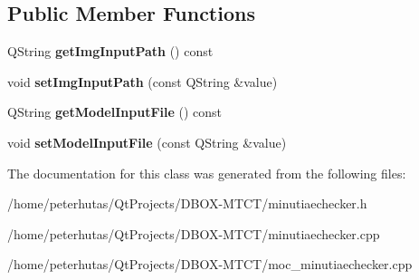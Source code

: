 \subsection*{Public Member Functions}
\begin{DoxyCompactItemize}
\item 
\mbox{\label{class_minutiae_checker_a51e097348e270276c9b228672e0f7bde}} 
Q\+String {\bfseries get\+Img\+Input\+Path} () const
\item 
\mbox{\label{class_minutiae_checker_afcdd93a3a47b33a4cc98c09012af1cbe}} 
void {\bfseries set\+Img\+Input\+Path} (const Q\+String \&value)
\item 
\mbox{\label{class_minutiae_checker_ae0a84fc6a6b61e1533f858c88274bc06}} 
Q\+String {\bfseries get\+Model\+Input\+File} () const
\item 
\mbox{\label{class_minutiae_checker_a869aa9d89402f735843214a9144b3642}} 
void {\bfseries set\+Model\+Input\+File} (const Q\+String \&value)
\end{DoxyCompactItemize}


The documentation for this class was generated from the following files\+:\begin{DoxyCompactItemize}
\item 
/home/peterhutas/\+Qt\+Projects/\+D\+B\+O\+X-\/\+M\+T\+C\+T/minutiaechecker.\+h\item 
/home/peterhutas/\+Qt\+Projects/\+D\+B\+O\+X-\/\+M\+T\+C\+T/minutiaechecker.\+cpp\item 
/home/peterhutas/\+Qt\+Projects/\+D\+B\+O\+X-\/\+M\+T\+C\+T/moc\+\_\+minutiaechecker.\+cpp\end{DoxyCompactItemize}
